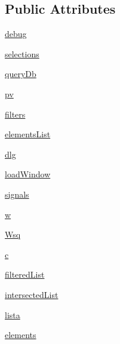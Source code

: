 \subsection*{Public Attributes}
\begin{DoxyCompactItemize}
\item 
\hyperlink{classmmasgis_1_1interrogazioni_1_1MainWindowQuery_a65e7194fe0dd2ceb58142f332ada6694}{debug}
\item 
\hyperlink{classmmasgis_1_1interrogazioni_1_1MainWindowQuery_afc3f42de190f9184a869d0a11da3a008}{selections}
\item 
\hyperlink{classmmasgis_1_1interrogazioni_1_1MainWindowQuery_a9603e340ec38a4a52939d3bfbe51e5b8}{queryDb}
\item 
\hyperlink{classmmasgis_1_1interrogazioni_1_1MainWindowQuery_a03c5c7360571e4839fe9475b9d4efa7c}{pv}
\item 
\hyperlink{classmmasgis_1_1interrogazioni_1_1MainWindowQuery_a77d26cc845e6c26b041f1c3b41211199}{filters}
\item 
\hyperlink{classmmasgis_1_1interrogazioni_1_1MainWindowQuery_a2bc9b3bb62cc58fd26b1e9513ab1abe2}{elementsList}
\item 
\hyperlink{classmmasgis_1_1interrogazioni_1_1MainWindowQuery_a0bfdc05fbc199ee766db3be53f9d323a}{dlg}
\item 
\hyperlink{classmmasgis_1_1interrogazioni_1_1MainWindowQuery_af16b78c96683211cb3d1769d36869cf7}{loadWindow}
\item 
\hyperlink{classmmasgis_1_1interrogazioni_1_1MainWindowQuery_a494116b0c8a66a34192a1559be0f3555}{signals}
\item 
\hyperlink{classmmasgis_1_1interrogazioni_1_1MainWindowQuery_aaacb944e93db5c958556b9c7d61ac65e}{w}
\item 
\hyperlink{classmmasgis_1_1interrogazioni_1_1MainWindowQuery_a724b158501be469ff56ec8c904b6fa46}{Wsq}
\item 
\hyperlink{classmmasgis_1_1interrogazioni_1_1MainWindowQuery_a243184ad1fe0d4d1205ef89d4d294822}{c}
\item 
\hyperlink{classmmasgis_1_1interrogazioni_1_1MainWindowQuery_aaf49acf3fa346ef5d168cfe81ca65982}{filteredList}
\item 
\hyperlink{classmmasgis_1_1interrogazioni_1_1MainWindowQuery_a5a9982b09a7f2406727ac4e738672b2f}{intersectedList}
\item 
\hyperlink{classmmasgis_1_1interrogazioni_1_1MainWindowQuery_a83f31af2bd5ec8cd6d50a3685b8ef6fd}{lista}
\item 
\hyperlink{classmmasgis_1_1interrogazioni_1_1MainWindowQuery_ae2212e71e52bb7fe28689264a95089d4}{elements}

\end{DoxyCompactItemize}
